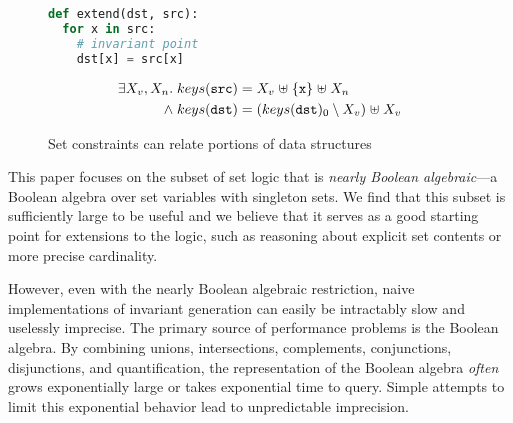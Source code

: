 \begin{figure}[tb]
  \newbox\exprogbox
  \begin{lrbox}{\exprogbox}
    \begin{minipage}[t][1cm][b]{0.4\textwidth}
      \begin{lstlisting}[language=python]
def extend(dst, src):
  for x in src:
    # invariant point
    dst[x] = src[x]
      \end{lstlisting}
    \end{minipage}
  \end{lrbox}
  \newbox\exproginv
  \begin{lrbox}{\exproginv}
    \begin{minipage}[t][0.9cm][b]{0.4\textwidth}
      \begin{align*}
        \exists X_v, X_n. \; keys(\texttt{src})
        & = X_v \mathrel{\uplus} \{\texttt{x}\} \mathrel{\uplus} X_n
        \\
        {} \mathrel{\wedge} keys(\texttt{dst})
        & = (keys(\texttt{dst})_0 \setminus X_v) \mathrel{\uplus} X_v
      \end{align*}
    \end{minipage}
  \end{lrbox}
  \centering
  \quad
  \caption{Set constraints can relate portions of data structures}
  \label{fig:intro-example}
\end{figure}

This paper focuses on the subset of set logic that is \emph{nearly
  Boolean algebraic}---a Boolean algebra over set variables with
singleton sets.
We find that this subset is sufficiently large to be useful and we
believe that it serves as a good starting point for extensions to the
logic, such as reasoning about explicit set contents or more precise
cardinality.

However, even with the nearly Boolean algebraic restriction, naive
implementations of invariant generation can easily be intractably
slow and uselessly imprecise.
The primary source of performance problems is the Boolean algebra.
By combining unions, intersections, complements, conjunctions,
disjunctions, and quantification, the representation of the Boolean
algebra \emph{often} grows exponentially large or takes exponential
time to query.
Simple attempts to limit this exponential behavior lead to unpredictable
imprecision.

